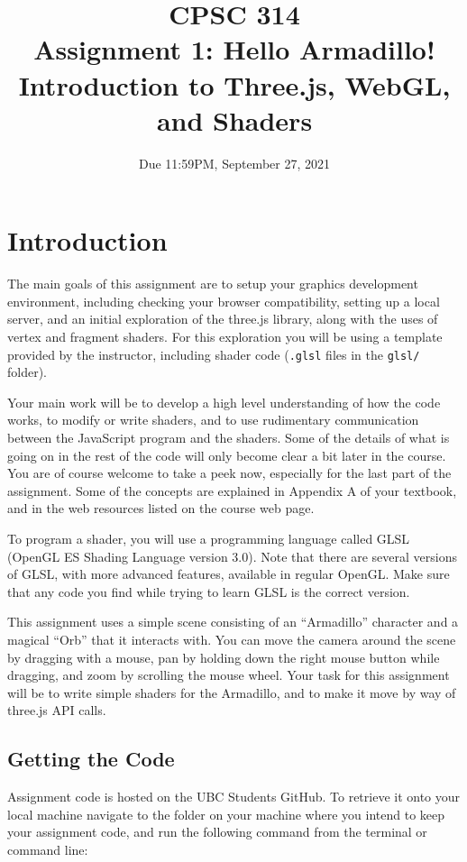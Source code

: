 \documentclass[12pt]{exam}
\begin{document}
\title{CPSC 314\\
  Assignment 1: Hello Armadillo! Introduction to Three.js, WebGL, and Shaders}
\date{Due 11:59PM, September 27, 2021}

\maketitle 

\section{Introduction}

The main goals of this assignment are to setup your graphics
development environment, including checking your browser
compatibility, setting up a local server, and an initial
exploration of the three.js library, along with the uses of vertex and fragment shaders. For this exploration you
will be using a template provided by the instructor, including shader
code ({\tt .glsl} files in the {\tt glsl/} folder).

Your main work will be to develop a high level understanding of how
the code works, to modify or write shaders, and to use
rudimentary communication between the JavaScript program and the
shaders.  Some of the details of what is going on in the rest of the
code will only become clear a bit later in the course.  You are of
course welcome to take a peek now, especially for the last part of the
assignment.  Some of the concepts are explained in Appendix A of your
textbook, and in the web resources listed on the course web page.

To program a shader, you will use a programming language called GLSL
(OpenGL ES Shading Language version 3.0). Note that there are several
versions of GLSL, with more advanced features, available in regular
OpenGL. Make sure that any code you find while trying to learn GLSL is
the correct version.

This assignment uses a simple scene consisting of an ``Armadillo''
character and a magical ``Orb'' that it interacts with. You can move
the camera around the scene by dragging with a mouse, pan by holding
down the right mouse button while dragging, and zoom by scrolling the
mouse wheel.  Your task for this assignment will be to write simple
shaders for the Armadillo, and to make it move by way of three.js API calls.

\subsection{Getting the Code}
Assignment code is hosted on the UBC Students GitHub. To retrieve it
onto your local machine navigate to the folder on your machine where you intend to keep your
assignment code, and run the following command from the terminal or command line:
\end{document}

